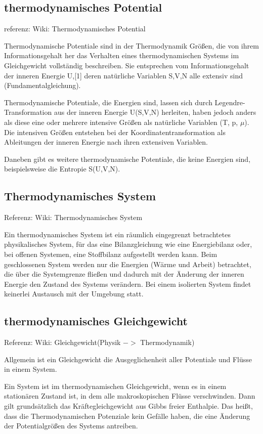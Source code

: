 \documentclass[]{article}
\begin{document}
\subsection{thermodynamisches Potential}
referenz: Wiki: Thermodynamisches Potential

Thermodynamische Potentiale sind in der Thermodynamik Größen, die von ihrem Informationsgehalt her das Verhalten eines thermodynamischen Systems im Gleichgewicht vollständig beschreiben. Sie entsprechen vom Informationsgehalt der inneren Energie U,[1] deren natürliche Variablen S,V,N alle extensiv sind (Fundamentalgleichung).

Thermodynamische Potentiale, die Energien sind, lassen sich durch Legendre-Transformation aus der inneren Energie U(S,V,N) herleiten, haben jedoch anders als diese eine oder mehrere intensive Größen als natürliche Variablen (T, p, $\mu$). Die intensiven Größen entstehen bei der Koordinatentransformation als Ableitungen der inneren Energie nach ihren extensiven Variablen.

Daneben gibt es weitere thermodynamische Potentiale, die keine Energien sind, beispielsweise die Entropie S(U,V,N).


\subsection{Thermodynamisches System}
Referenz: Wiki: Thermodynamisches System

Ein thermodynamisches System ist ein räumlich eingegrenzt betrachtetes physikalisches System, für das eine Bilanzgleichung wie eine Energiebilanz oder, bei offenen Systemen, eine Stoffbilanz aufgestellt werden kann. Beim geschlossenen System werden nur die Energien (Wärme und Arbeit) betrachtet, die über die Systemgrenze fließen und dadurch mit der Änderung der inneren Energie den Zustand des Systems verändern. Bei einem isolierten System findet keinerlei Austausch mit der Umgebung statt.


\subsection{thermodynamisches Gleichgewicht}
Referenz: Wiki: Gleichgewicht(Physik $->$ Thermodynamik) 

Allgemein ist ein Gleichgewicht die Ausgeglichenheit aller Potentiale und Flüsse in einem System.
 
Ein System ist im thermodynamischen Gleichgewicht, wenn es in einem stationären Zustand ist, in dem alle makroskopischen Flüsse verschwinden. Dann gilt grundsätzlich das Kräftegleichgewicht aus Gibbs freier Enthalpie. Das heißt, dass die Thermodynamischen Potenziale kein Gefälle haben, die eine Änderung der Potentialgrößen des Systems antreiben.
\end{document}
